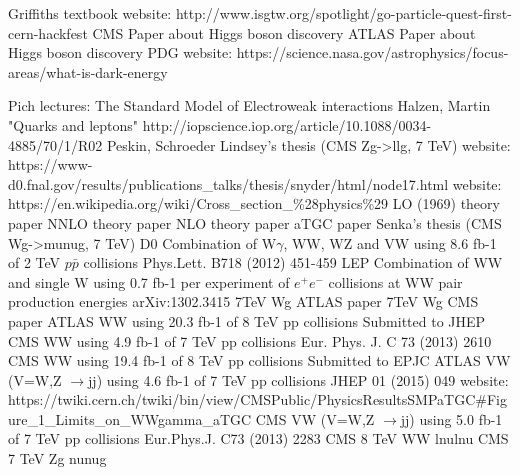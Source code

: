 \begin{thebibliography}{1}


 Griffiths textbook
 website: http://www.isgtw.org/spotlight/go-particle-quest-first-cern-hackfest
 CMS Paper about Higgs boson discovery
 ATLAS Paper about Higgs boson discovery
 PDG
 website: https://science.nasa.gov/astrophysics/focus-areas/what-is-dark-energy


 Pich lectures: The Standard Model of Electroweak interactions
 Halzen, Martin "Quarks and leptons"
 http://iopscience.iop.org/article/10.1088/0034-4885/70/1/R02
 Peskin, Schroeder
 Lindsey's thesis (CMS Zg->llg, 7 TeV)
 website: https://www-d0.fnal.gov/results/publications\_talks/thesis/snyder/html/node17.html
 website: https://en.wikipedia.org/wiki/Cross\_section\_\%28physics\%29
 LO (1969) theory paper
 NNLO theory paper
 NLO theory paper
 aTGC paper
 Senka's thesis (CMS Wg->munug, 7 TeV)
 D0 Combination of W$\gamma$, WW, WZ and VW using 8.6 fb-1 of 2 TeV $p\bar{p}$ collisions Phys.Lett. B718 (2012) 451-459 
 LEP Combination of WW and single W using 0.7 fb-1 per experiment of $e^+e^-$ collisions at WW pair production energies arXiv:1302.3415
 7TeV Wg ATLAS paper
 7TeV Wg CMS paper
 ATLAS WW using 20.3 fb-1 of 8 TeV pp collisions Submitted to JHEP
 CMS WW using 4.9 fb-1 of 7 TeV pp collisions Eur. Phys. J. C 73 (2013) 2610
 CMS WW using 19.4 fb-1 of 8 TeV pp collisions Submitted to EPJC
 ATLAS VW (V=W,Z $\rightarrow$jj) using 4.6 fb-1 of 7 TeV pp collisions JHEP 01 (2015) 049
 website: https://twiki.cern.ch/twiki/bin/view/CMSPublic/PhysicsResultsSMPaTGC\#Figure\_1\_Limits\_on\_WWgamma\_aTGC
 CMS VW (V=W,Z $\rightarrow$jj) using 5.0 fb-1 of 7 TeV pp collisions Eur.Phys.J. C73 (2013) 2283
 CMS 8 TeV WW lnulnu
 CMS 7 TeV Zg nunug


\end{thebibliography}
